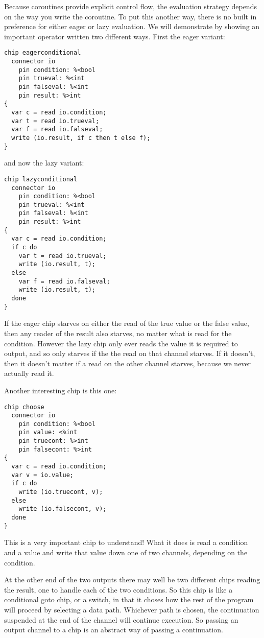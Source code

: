 \documentclass[oneside]{book}
\begin{document}
Because coroutines provide explicit control flow, the evaluation
strategy depends on the way you write the coroutine. To put this
another way, there is no built in preference for either eager or
lazy evaluation. We will demonstrate by showing an important
operator written two different ways. First the eager variant:

\begin{verbatim}
chip eagerconditional
  connector io
    pin condition: %<bool
    pin trueval: %<int
    pin falseval: %<int
    pin result: %>int
{
  var c = read io.condition;
  var t = read io.trueval;
  var f = read io.falseval;
  write (io.result, if c then t else f);
}
\end{verbatim}

and now the lazy variant:

\begin{verbatim}
chip lazyconditional
  connector io
    pin condition: %<bool
    pin trueval: %<int
    pin falseval: %<int
    pin result: %>int
{
  var c = read io.condition;
  if c do
    var t = read io.trueval;
    write (io.result, t);
  else 
    var f = read io.falseval;
    write (io.result, t);
  done
}
\end{verbatim}

If the eager chip starves on either the read of the true value
or the false value, then any reader of the result also starves,
no matter what is read for the condition. However the lazy
chip only ever reads the value it is required to output,
and so only starves if the the read on that channel starves.
If it doesn't, then it doesn't matter if a read on the
other channel starves, because we never actually read it.

Another interesting chip is this one:

\begin{verbatim}
chip choose
  connector io
    pin condition: %<bool
    pin value: <%int
    pin truecont: %>int
    pin falsecont: %>int
{
  var c = read io.condition;
  var v = io.value;
  if c do
    write (io.truecont, v);
  else
    write (io.falsecont, v);
  done
}
\end{verbatim}

This is a very important chip to understand! What it does is read
a condition and a value and write that value down one of two 
channels, depending on the condition.

At the other end of the two outputs
there may well be two different chips reading the result,
one to handle each of the two conditions. So this chip is like
a conditional goto chip, or a switch, in that it choses how
the rest of the program will proceed by selecting a data
path. Whichever path is chosen, the continuation suspended
at the end of the channel will continue execution. So passing
an output channel to a chip is an abstract way of passing
a continuation.
\end{document}

